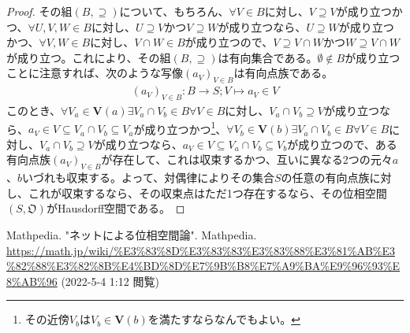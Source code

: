 \documentclass[dvipdfmx]{jsarticle}
\begin{document}
\begin{proof}
その組$(B, \supseteq )$について、もちろん、$\forall V \in B$に対し、$V \supseteq V$が成り立つかつ、$\forall U,V,W \in B$に対し、$U \supseteq V$かつ$V \supseteq W$が成り立つなら、$U \supseteq W$が成り立つかつ、$\forall V,W \in B$に対し、$V \cap W \in B$が成り立つので、$V \supseteq V \cap W$かつ$W \supseteq V \cap W$が成り立つ。これにより、その組$(B, \supseteq )$は有向集合である。$\emptyset \notin B$が成り立つことに注意すれば、次のような写像$\left( a_{V} \right)_{V \in B}$は有向点族である。
\begin{align*}
\left( a_{V} \right)_{V \in B}:B \rightarrow S;V \mapsto a_{V} \in V
\end{align*}
このとき、$\forall V_{a} \in \mathbf{V}(a)\exists V_{a} \cap V_{b} \in B\forall V \in B$に対し、$V_{a} \cap V_{b} \supseteq V$が成り立つなら、$a_{V} \in V \subseteq V_{a} \cap V_{b} \subseteq V_{a}$が成り立つかつ\footnote{その近傍$V_{b}$は$V_{b} \in \mathbf{V}(b)$を満たすならなんでもよい。}、$\forall V_{b} \in \mathbf{V}(b)\exists V_{a} \cap V_{b} \in B\forall V \in B$に対し、$V_{a} \cap V_{b} \supseteq V$が成り立つなら、$a_{V} \in V \subseteq V_{a} \cap V_{b} \subseteq V_{b}$が成り立つので、ある有向点族$\left( a_{V} \right)_{V \in B}$が存在して、これは収束するかつ、互いに異なる2つの元々$a$、$b$いづれも収束する。よって、対偶律によりその集合$S$の任意の有向点族に対し、これが収束するなら、その収束点はただ1つ存在するなら、その位相空間$\left( S,\mathfrak{O} \right)$がHausdorff空間である。
\end{proof}
\begin{thebibliography}{50}
  Mathpedia. "ネットによる位相空間論". Mathpedia. \url{https://math.jp/wiki/%E3%83%8D%E3%83%83%E3%83%88%E3%81%AB%E3%82%88%E3%82%8B%E4%BD%8D%E7%9B%B8%E7%A9%BA%E9%96%93%E8%AB%96} (2022-5-4 1:12 閲覧)
\end{thebibliography}
\end{document}
